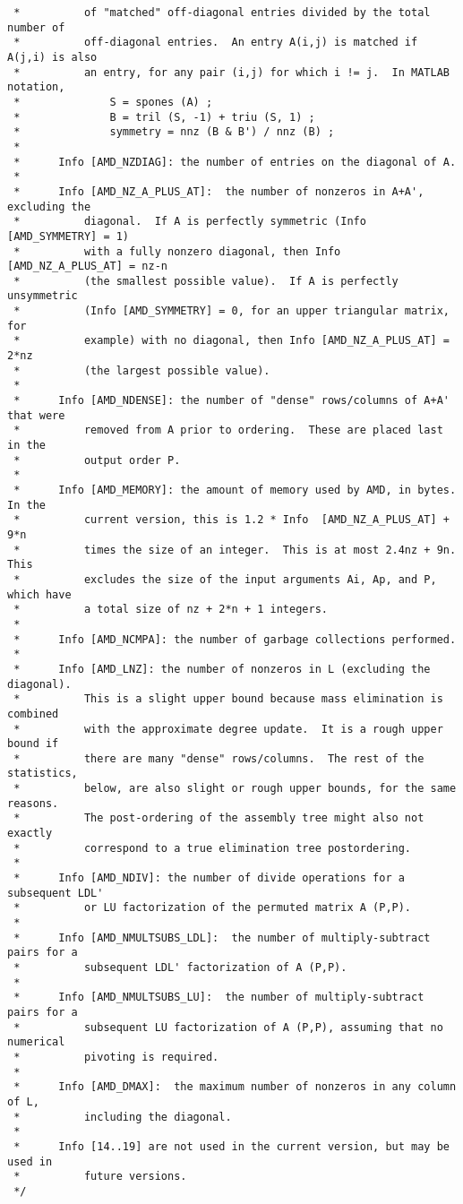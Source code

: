 \documentclass[11pt]{article}
\begin{document}
{\begin{verbatim}
 *          of "matched" off-diagonal entries divided by the total number of
 *          off-diagonal entries.  An entry A(i,j) is matched if A(j,i) is also
 *          an entry, for any pair (i,j) for which i != j.  In MATLAB notation,
 *              S = spones (A) ;
 *              B = tril (S, -1) + triu (S, 1) ;
 *              symmetry = nnz (B & B') / nnz (B) ;
 *
 *      Info [AMD_NZDIAG]: the number of entries on the diagonal of A.
 *
 *      Info [AMD_NZ_A_PLUS_AT]:  the number of nonzeros in A+A', excluding the
 *          diagonal.  If A is perfectly symmetric (Info [AMD_SYMMETRY] = 1)
 *          with a fully nonzero diagonal, then Info [AMD_NZ_A_PLUS_AT] = nz-n
 *          (the smallest possible value).  If A is perfectly unsymmetric
 *          (Info [AMD_SYMMETRY] = 0, for an upper triangular matrix, for
 *          example) with no diagonal, then Info [AMD_NZ_A_PLUS_AT] = 2*nz
 *          (the largest possible value).
 *
 *      Info [AMD_NDENSE]: the number of "dense" rows/columns of A+A' that were
 *          removed from A prior to ordering.  These are placed last in the
 *          output order P.
 *
 *      Info [AMD_MEMORY]: the amount of memory used by AMD, in bytes.  In the
 *          current version, this is 1.2 * Info  [AMD_NZ_A_PLUS_AT] + 9*n
 *          times the size of an integer.  This is at most 2.4nz + 9n.  This
 *          excludes the size of the input arguments Ai, Ap, and P, which have
 *          a total size of nz + 2*n + 1 integers.
 *
 *      Info [AMD_NCMPA]: the number of garbage collections performed.
 *
 *      Info [AMD_LNZ]: the number of nonzeros in L (excluding the diagonal).
 *          This is a slight upper bound because mass elimination is combined
 *          with the approximate degree update.  It is a rough upper bound if
 *          there are many "dense" rows/columns.  The rest of the statistics,
 *          below, are also slight or rough upper bounds, for the same reasons.
 *          The post-ordering of the assembly tree might also not exactly
 *          correspond to a true elimination tree postordering.
 *
 *      Info [AMD_NDIV]: the number of divide operations for a subsequent LDL'
 *          or LU factorization of the permuted matrix A (P,P).
 *
 *      Info [AMD_NMULTSUBS_LDL]:  the number of multiply-subtract pairs for a
 *          subsequent LDL' factorization of A (P,P).
 *
 *      Info [AMD_NMULTSUBS_LU]:  the number of multiply-subtract pairs for a
 *          subsequent LU factorization of A (P,P), assuming that no numerical
 *          pivoting is required.
 *
 *      Info [AMD_DMAX]:  the maximum number of nonzeros in any column of L,
 *          including the diagonal.
 *
 *      Info [14..19] are not used in the current version, but may be used in
 *          future versions.
 */    


\end{verbatim}}
\end{document}
